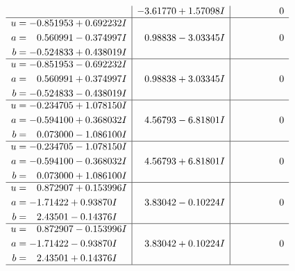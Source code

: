 \documentclass[1p]{elsarticle_modified}
\theoremstyle{definition}
\begin{document}
$$\begin{array}{c|c|c}
 & -3.61770 + 1.57098 I & \phantom{-0.000000 } 0 \\ \hline\begin{aligned}
u &= -0.851953 + 0.692232 I \\
a &= \phantom{-}0.560991 - 0.374997 I \\
b &= -0.524833 + 0.438019 I\end{aligned}
 & \phantom{-}0.98838 - 3.03345 I & \phantom{-0.000000 } 0 \\ \hline\begin{aligned}
u &= -0.851953 - 0.692232 I \\
a &= \phantom{-}0.560991 + 0.374997 I \\
b &= -0.524833 - 0.438019 I\end{aligned}
 & \phantom{-}0.98838 + 3.03345 I & \phantom{-0.000000 } 0 \\ \hline\begin{aligned}
u &= -0.234705 + 1.078150 I \\
a &= -0.594100 + 0.368032 I \\
b &= \phantom{-}0.073000 - 1.086100 I\end{aligned}
 & \phantom{-}4.56793 - 6.81801 I & \phantom{-0.000000 } 0 \\ \hline\begin{aligned}
u &= -0.234705 - 1.078150 I \\
a &= -0.594100 - 0.368032 I \\
b &= \phantom{-}0.073000 + 1.086100 I\end{aligned}
 & \phantom{-}4.56793 + 6.81801 I & \phantom{-0.000000 } 0 \\ \hline\begin{aligned}
u &= \phantom{-}0.872907 + 0.153996 I \\
a &= -1.71422 + 0.93870 I \\
b &= \phantom{-}2.43501 - 0.14376 I\end{aligned}
 & \phantom{-}3.83042 - 0.10224 I & \phantom{-0.000000 } 0 \\ \hline\begin{aligned}
u &= \phantom{-}0.872907 - 0.153996 I \\
a &= -1.71422 - 0.93870 I \\
b &= \phantom{-}2.43501 + 0.14376 I\end{aligned}
 & \phantom{-}3.83042 + 0.10224 I & \phantom{-0.000000 } 0\\
 \hline 
 \end{array}$$\newpage$$\begin{array}{c|c|c}  

\end{array}$$
\end{document}
